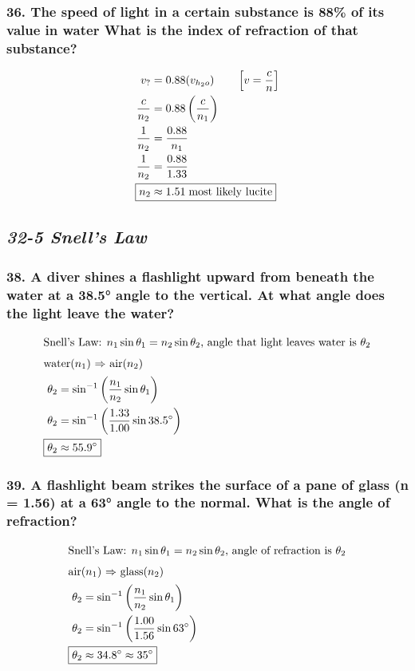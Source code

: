 \documentclass{article}
\newcommand{\bp}[1]{\left(#1\right)}
\begin{document}
\subsubsection*{
    36. The speed of light in a certain substance is 88\% of its value in water 
    What is the index of refraction of that substance?
}
\begin{align*}
    v_? &= 0.88(v_{h_2o})\qquad \left[v = \frac c n\right] \\
    \displaystyle\frac{c}{n_2} &= 0.88\bp{\frac c {n_1}} \\
    \displaystyle\frac{1}{n_2} &= \frac {0.88} {n_1} \\
    \displaystyle\frac{1}{n_2} &= \frac {0.88} {1.33} \\
    \Aboxed{n_2 &\approx 1.51\; \text{most likely lucite}}
\end{align*}
\newpage 
\begin{center}
    \subsection*{\textbf{\textit{32-5 Snell's Law}}}
\end{center}
\subsubsection*{
    38. A diver shines a flashlight upward from beneath the water at a 38.5° angle
    to the vertical. At what angle does the light leave the water?
}
\begin{align*}
    \intertext{Snell's Law: $n_1\sin\theta_1 = n_2\sin\theta_2$, angle that
    light leaves water is $\theta_2$}
    \intertext{water($n_1$) $\Rightarrow$ air($n_2$)}
    \theta_2 &= \sin^{-1}\bp{\displaystyle\frac{n_1}{n_2}\sin\theta_1} \\
    \theta_2 &= \sin^{-1}\bp{\displaystyle\frac{1.33}{1.00}\sin 38.5\degree} \\
    \Aboxed{\theta_2 &\approx 55.9\degree}
\end{align*}
\subsubsection*{
    39. A flashlight beam strikes the surface of a pane of glass (n = 1.56) at a 63°
    angle to the normal. What is the angle of refraction?
}
\begin{align*}
    \intertext{Snell's Law: $n_1\sin\theta_1 = n_2\sin\theta_2$, angle of
    refraction is $\theta_2$}
    \intertext{air($n_1$) $\Rightarrow$ glass($n_2$)}
    \theta_2 &= \sin^{-1}\bp{\displaystyle\frac{n_1}{n_2}\sin\theta_1} \\
    \theta_2 &= \sin^{-1}\bp{\displaystyle\frac{1.00}{1.56}\sin 63\degree} \\
    \Aboxed{\theta_2 &\approx 34.8\degree \approx 35\degree}
\end{align*}
\end{document}
